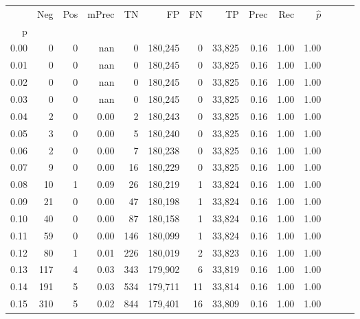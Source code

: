 \begin{tabular}{rrrrrrrrrrrrrr}
\toprule
{} &    Neg &    Pos & mPrec &       TN &       FP &      FN &      TP &  Prec &   Rec & $\hat{p}$ \\
p    &        &        &       &          &          &         &         &       &       &           \\
\midrule
0.00 &      0 &      0 &   nan &        0 &  180,245 &       0 &  33,825 &  0.16 &  1.00 &      1.00 \\
0.01 &      0 &      0 &   nan &        0 &  180,245 &       0 &  33,825 &  0.16 &  1.00 &      1.00 \\
0.02 &      0 &      0 &   nan &        0 &  180,245 &       0 &  33,825 &  0.16 &  1.00 &      1.00 \\
0.03 &      0 &      0 &   nan &        0 &  180,245 &       0 &  33,825 &  0.16 &  1.00 &      1.00 \\
0.04 &      2 &      0 &  0.00 &        2 &  180,243 &       0 &  33,825 &  0.16 &  1.00 &      1.00 \\
0.05 &      3 &      0 &  0.00 &        5 &  180,240 &       0 &  33,825 &  0.16 &  1.00 &      1.00 \\
0.06 &      2 &      0 &  0.00 &        7 &  180,238 &       0 &  33,825 &  0.16 &  1.00 &      1.00 \\
0.07 &      9 &      0 &  0.00 &       16 &  180,229 &       0 &  33,825 &  0.16 &  1.00 &      1.00 \\
0.08 &     10 &      1 &  0.09 &       26 &  180,219 &       1 &  33,824 &  0.16 &  1.00 &      1.00 \\
0.09 &     21 &      0 &  0.00 &       47 &  180,198 &       1 &  33,824 &  0.16 &  1.00 &      1.00 \\
0.10 &     40 &      0 &  0.00 &       87 &  180,158 &       1 &  33,824 &  0.16 &  1.00 &      1.00 \\
0.11 &     59 &      0 &  0.00 &      146 &  180,099 &       1 &  33,824 &  0.16 &  1.00 &      1.00 \\
0.12 &     80 &      1 &  0.01 &      226 &  180,019 &       2 &  33,823 &  0.16 &  1.00 &      1.00 \\
0.13 &    117 &      4 &  0.03 &      343 &  179,902 &       6 &  33,819 &  0.16 &  1.00 &      1.00 \\
0.14 &    191 &      5 &  0.03 &      534 &  179,711 &      11 &  33,814 &  0.16 &  1.00 &      1.00 \\
0.15 &    310 &      5 &  0.02 &      844 &  179,401 &      16 &  33,809 &  0.16 &  1.00 &      1.00 \\

\end{tabular}
